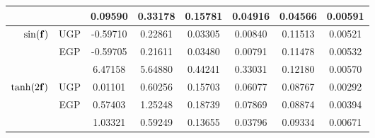 \documentclass{article} %
\begin{document}
\begin{table}[tb]
\begin{tabular}{r|c| c c c c c c}
& \cite{Opper2009} & 0.09590 & 0.33178 & 0.15781 & 0.04916 & 0.04566 & 0.00591 \\
        \midrule
        $\sin\!\left({\mathbf{f}}\right)$ 
& UGP & -0.59710 & 0.22861 & 0.03305 & 0.00840 & 0.11513 & 0.00521 \\
& EGP & -0.59705 & 0.21611 & 0.03480 & 0.00791 & 0.11478 & 0.00532 \\
& \cite{Opper2009} & 6.47158 & 5.64880 & 0.44241 & 0.33031 & 0.12180 & 0.00570
\\
        \midrule
        $\tanh\!\left({2\mathbf{f}}\right)$
& UGP & 0.01101 & 0.60256 & 0.15703 & 0.06077 & 0.08767 & 0.00292 \\
& EGP & 0.57403 & 1.25248 & 0.18739 & 0.07869 & 0.08874 & 0.00394 \\
& \cite{Opper2009} & 1.03321 & 0.59249 & 0.13655 & 0.03796 & 0.09334 & 0.00671 \\
        \bottomrule
    \end{tabular}
    \label{tab:toy}
\end{table}
%
\end{document}
